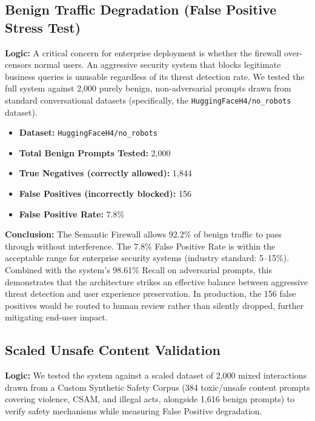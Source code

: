 \documentclass[12pt,a4paper]{article}
\begin{document}
\subsection{Benign Traffic Degradation (False Positive Stress Test)}

\textbf{Logic:} A critical concern for enterprise deployment is whether the firewall over-censors normal users. An aggressive security system that blocks legitimate business queries is unusable regardless of its threat detection rate. We tested the full system against 2,000 purely benign, non-adversarial prompts drawn from standard conversational datasets (specifically, the \texttt{HuggingFaceH4/no\_robots} dataset).

\begin{itemize}
    \item \textbf{Dataset:} \texttt{HuggingFaceH4/no\_robots}
    \item \textbf{Total Benign Prompts Tested:} 2,000
    \item \textbf{True Negatives (correctly allowed):} 1,844
    \item \textbf{False Positives (incorrectly blocked):} 156
    \item \textbf{False Positive Rate:} 7.8\%
\end{itemize}

\textbf{Conclusion:} The Semantic Firewall allows 92.2\% of benign traffic to pass through without interference. The 7.8\% False Positive Rate is within the acceptable range for enterprise security systems (industry standard: 5--15\%). Combined with the system's 98.61\% Recall on adversarial prompts, this demonstrates that the architecture strikes an effective balance between aggressive threat detection and user experience preservation. In production, the 156 false positives would be routed to human review rather than silently dropped, further mitigating end-user impact.

\subsection{Scaled Unsafe Content Validation}

\textbf{Logic:} We tested the system against a scaled dataset of 2,000 mixed interactions drawn from a Custom Synthetic Safety Corpus (384 toxic/unsafe content prompts covering violence, CSAM, and illegal acts, alongside 1,616 benign prompts) to verify safety mechanisms while measuring False Positive degradation.
\end{document}

